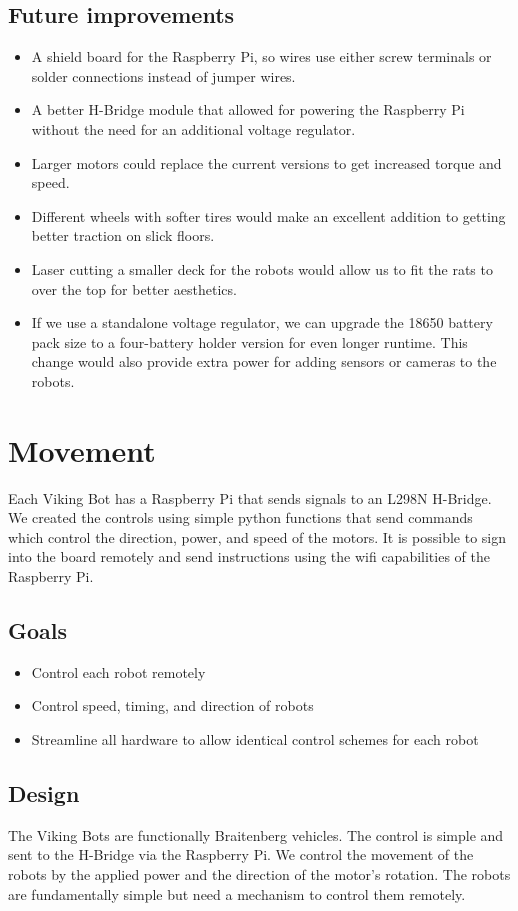 \documentclass[a4paper,12pt]{article}
\begin{document}
\subsection{Future improvements}
	\begin{itemize}
		\item A shield board for the Raspberry Pi, so wires use either screw terminals or solder connections instead of jumper wires.
		\item A better H-Bridge module that allowed for powering the Raspberry Pi without the need for an additional voltage regulator.
		\item Larger motors could replace the current versions to get increased torque and speed.
		\item Different wheels with softer tires would make an excellent addition to getting better traction on slick floors.
		\item Laser cutting a smaller deck for the robots would allow us to fit the rats to over the top for better aesthetics.
		\item If we use a standalone voltage regulator, we can upgrade the 18650 battery pack size to a four-battery holder version for even longer runtime. This change would also provide extra power for adding sensors or cameras to the robots.
	\end{itemize}

\section{Movement}
	Each Viking Bot has a Raspberry Pi that sends signals to an L298N H-Bridge. We created the controls using simple python functions that send commands which control the direction, power, and speed of the motors. It is possible to sign into the board remotely and send instructions using the wifi capabilities of the Raspberry Pi.

\subsection{Goals}
	\begin{itemize}
		\item Control each robot remotely
		\item Control speed, timing, and direction of robots
		\item Streamline all hardware to allow identical control schemes for each robot
	\end{itemize}

\subsection{Design}
	The Viking Bots are functionally Braitenberg vehicles. The control is simple and sent to the H-Bridge via the Raspberry Pi. We control the movement of the robots by the applied power and the direction of the motor’s rotation. The robots are fundamentally simple but need a mechanism to control them remotely.
\end{document}
